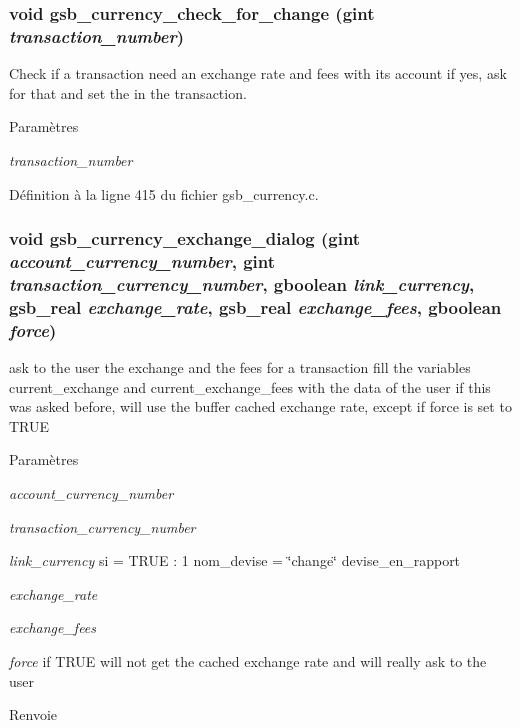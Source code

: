 \subsubsection[{gsb\_\-currency\_\-check\_\-for\_\-change}]{\setlength{\rightskip}{0pt plus 5cm}void gsb\_\-currency\_\-check\_\-for\_\-change (gint {\em transaction\_\-number})}\label{gsb__currency_8h_aad743bb08129ef82240ca9ecc743b4dc}
Check if a transaction need an exchange rate and fees with its account if yes, ask for that and set the in the transaction.


\begin{DoxyParams}{Paramètres}
\item[{\em transaction\_\-number}]\end{DoxyParams}


Définition à la ligne 415 du fichier gsb\_\-currency.c.

\subsubsection[{gsb\_\-currency\_\-exchange\_\-dialog}]{\setlength{\rightskip}{0pt plus 5cm}void gsb\_\-currency\_\-exchange\_\-dialog (gint {\em account\_\-currency\_\-number}, \/  gint {\em transaction\_\-currency\_\-number}, \/  gboolean {\em link\_\-currency}, \/  {\bf gsb\_\-real} {\em exchange\_\-rate}, \/  {\bf gsb\_\-real} {\em exchange\_\-fees}, \/  gboolean {\em force})}\label{gsb__currency_8h_a729f791b99a98165dcd022823e0613c4}
ask to the user the exchange and the fees for a transaction fill the variables current\_\-exchange and current\_\-exchange\_\-fees with the data of the user if this was asked before, will use the buffer cached exchange rate, except if force is set to TRUE


\begin{DoxyParams}{Paramètres}
\item[{\em account\_\-currency\_\-number}]\item[{\em transaction\_\-currency\_\-number}]\item[{\em link\_\-currency}]si = TRUE : 1 nom\_\-devise = \char`\"{}change\char`\"{} devise\_\-en\_\-rapport \item[{\em exchange\_\-rate}]\item[{\em exchange\_\-fees}]\item[{\em force}]if TRUE will not get the cached exchange rate and will really ask to the user\end{DoxyParams}
\begin{DoxyReturn}{Renvoie}

\end{DoxyReturn}


